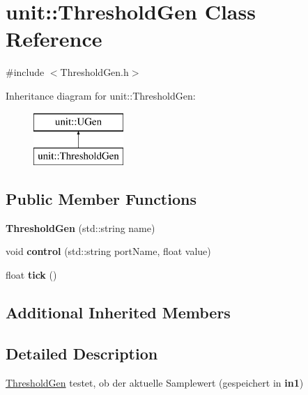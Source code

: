 \hypertarget{classunit_1_1ThresholdGen}{\section{unit\-:\-:Threshold\-Gen Class Reference}
\label{classunit_1_1ThresholdGen}
}


{\ttfamily \#include $<$Threshold\-Gen.\-h$>$}

Inheritance diagram for unit\-:\-:Threshold\-Gen\-:\begin{figure}[H]
\begin{center}
\leavevmode
\includegraphics[height=2.000000cm]{classunit_1_1ThresholdGen}
\end{center}
\end{figure}
\subsection*{Public Member Functions}
\begin{DoxyCompactItemize}
\item 
\hypertarget{classunit_1_1ThresholdGen_ac4b7861be1523284fbd1158afa6da231}{{\bfseries Threshold\-Gen} (std\-::string name)}\label{classunit_1_1ThresholdGen_ac4b7861be1523284fbd1158afa6da231}

\item 
\hypertarget{classunit_1_1ThresholdGen_aafd3ea65bfc964598119efd3988068ee}{void {\bfseries control} (std\-::string port\-Name, float value)}\label{classunit_1_1ThresholdGen_aafd3ea65bfc964598119efd3988068ee}

\item 
\hypertarget{classunit_1_1ThresholdGen_a422ab3288c91db592849ca1328a6ee6b}{float {\bfseries tick} ()}\label{classunit_1_1ThresholdGen_a422ab3288c91db592849ca1328a6ee6b}

\end{DoxyCompactItemize}
\subsection*{Additional Inherited Members}


\subsection{Detailed Description}
\hyperlink{classunit_1_1ThresholdGen}{Threshold\-Gen} testet, ob der aktuelle Samplewert (gespeichert in {\bfseries in1})


